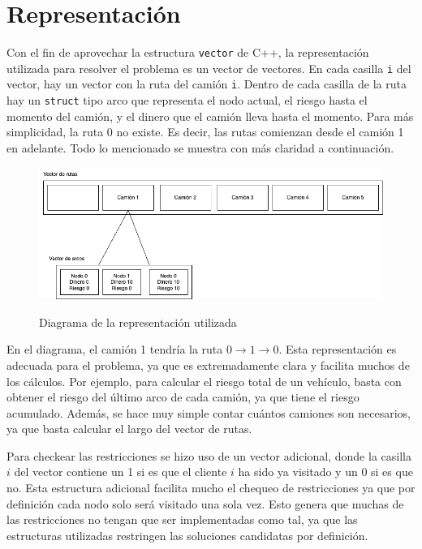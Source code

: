 \documentclass{article}
\begin{document}
\section{Representaci\'on}
Con el fin de aprovechar la estructura \texttt{vector} de C++, la representación utilizada para resolver el problema es un vector de vectores. En cada casilla \texttt{i} del vector, hay un vector con la ruta del camión \texttt{i}. Dentro de cada casilla de la ruta hay un \texttt{struct} tipo arco que representa el nodo actual, el riesgo hasta el momento del camión, y el dinero que el camión lleva hasta el momento. Para más simplicidad, la ruta 0 no existe. Es decir, las rutas comienzan desde el camión 1 en adelante. Todo lo mencionado se muestra con más claridad a continuación.
\begin{center}
    \begin{figure}[H]
        \includegraphics[scale = 0.5]{images/vectores.png}
        \label{fig: representación}
        \caption{Diagrama de la representación utilizada}
    \end{figure}
\end{center}

En el diagrama, el camión 1 tendría la ruta $0 \rightarrow 1 \rightarrow 0$. Esta representación es adecuada para el problema, ya que es extremadamente clara y facilita muchos de los cálculos. Por ejemplo, para calcular el riesgo total de un vehículo, basta con obtener el riesgo del último arco de cada camión, ya que tiene el riesgo acumulado. Además, se hace muy simple contar cuántos camiones son necesarios, ya que basta calcular el largo del vector de rutas. 

Para checkear las restricciones se hizo uso de un vector adicional, donde la casilla $i$ del vector contiene un 1 si es que el cliente $i$ ha sido ya visitado y un $0$ si es que no. Esta estructura adicional facilita mucho el chequeo de restricciones ya que por definición cada nodo solo será visitado una sola vez. Esto genera que muchas de las restricciones no tengan que ser implementadas como tal, ya que las estructuras utilizadas restringen las soluciones candidatas por definición. 
\end{document}
